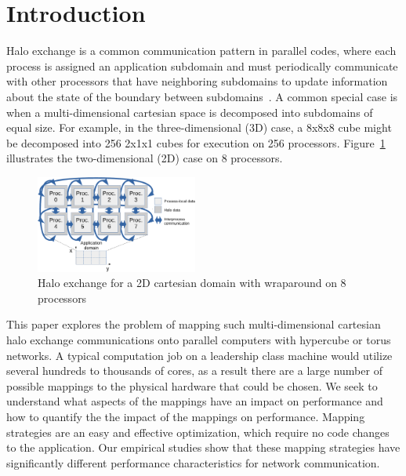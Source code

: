 \documentclass{acm_proc_article-sp}
\begin{document}
\section{Introduction}

Halo exchange is a common communication pattern in parallel codes, where
each process is assigned an application subdomain and must periodically
communicate with other processors that have neighboring subdomains to
update information about the state of the boundary between subdomains~\cite{Kjolstad_2010}.
A common special case is when a multi-dimensional cartesian space is
decomposed into subdomains of equal size.  For example, in the three-dimensional
(3D) case, a 8x8x8 cube might be decomposed into 256 2x1x1 cubes for execution on 256 processors.
Figure~\ref{fig:halo-illustration} illustrates the two-dimensional (2D) case on 8
processors.

\begin{figure}
  \center
  \includegraphics[width=0.475\textwidth]{fig/halo-illustration}
  \caption{Halo exchange for a 2D cartesian domain with wraparound on 8 processors}
    \label{fig:halo-illustration}
\end{figure}

This paper explores the problem of mapping such multi-dimensional cartesian
halo exchange communications onto parallel computers with hypercube or
torus networks. A typical computation job on a leadership class machine would
utilize several hundreds to thousands of cores, as a result there are a large number of
possible mappings to the physical hardware that could be chosen. We seek to understand
what aspects of the mappings have an impact on performance and how to quantify the the impact of the mappings on performance. Mapping strategies
are an easy and effective optimization, which require no code changes to the application.  Our empirical studies show that these mapping strategies have significantly
different performance characteristics for network communication.

\end{document}
